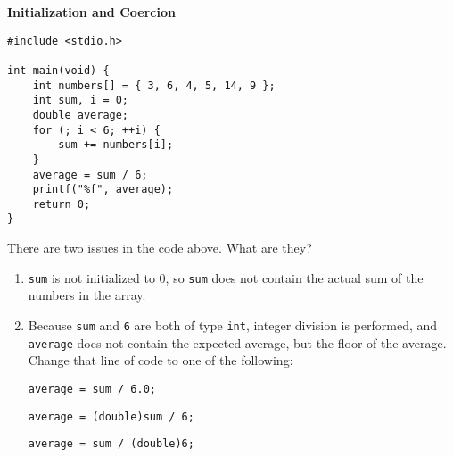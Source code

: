 \textbf{Initialization and Coercion}

\begin{verbatim}
#include <stdio.h>

int main(void) {
    int numbers[] = { 3, 6, 4, 5, 14, 9 };
    int sum, i = 0;
    double average;
    for (; i < 6; ++i) {
        sum += numbers[i];
    }
    average = sum / 6;
    printf("%f", average);
    return 0;
}
\end{verbatim}

There are two issues in the code above. What are they?

\begin{answer}
\begin{enumerate}
\item \texttt{sum} is not initialized to 0, so \texttt{sum} does not contain the actual sum of the numbers in the array.
\item Because \texttt{sum} and \texttt{6} are both of type \texttt{int}, integer division is performed, and \texttt{average} does not contain the expected average, but the floor of the average. Change that line of code to one of the following:
\begin{verbatim}
average = sum / 6.0;
\end{verbatim}
\begin{verbatim}
average = (double)sum / 6;
\end{verbatim}
\begin{verbatim}
average = sum / (double)6;
\end{verbatim}
\end{enumerate}
\end{answer}
